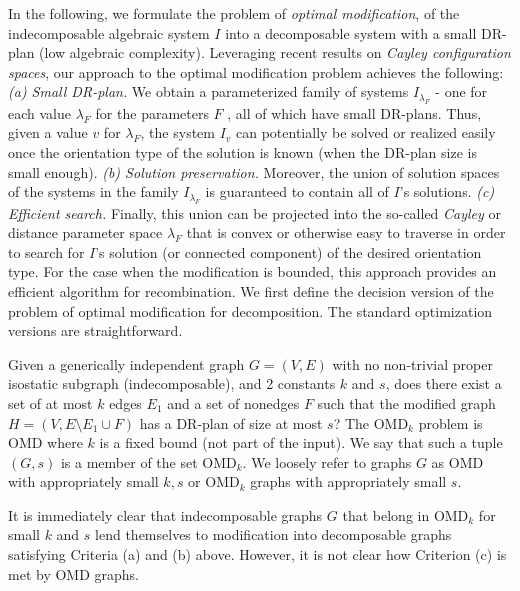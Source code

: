In the following, we formulate the problem of {\em optimal
modification},
of the indecomposable
algebraic system $I$ into a decomposable system with a small DR-plan (low
algebraic complexity).
Leveraging recent results on {\em Cayley
configuration spaces}, our approach to the optimal modification problem
achieves the following: {\em (a) Small DR-plan.} We obtain a  parameterized family of systems
$I_{\lambda_F}$ -  one for each value $\lambda_F$ for the parameters $F$ ,  all of which have
small DR-plans. Thus, given a value $v$ for $\lambda_F$, the system $I_v$ can
potentially be solved or realized easily once the orientation type of the solution
is known  (when the DR-plan size is small enough).
{\em (b) Solution preservation.} Moreover, the union of solution spaces of the systems in the family
$I_{\lambda_F}$
is guaranteed to contain
all of $I$'s solutions. {\em (c) Efficient search.} Finally, this union can be projected into the
so-called {\em Cayley} or distance parameter space $\lambda_F$ that is convex
or otherwise easy to traverse in order to search for $I$'s solution
(or connected component)
of the desired orientation type.
For the case when the modification is bounded, this approach provides an efficient
algorithm for recombination. We first define the decision version of the
problem of optimal modification
for decomposition. The standard optimization versions are straightforward.

\medskip{} Given a generically
independent graph $G = (V,E)$
with no non-trivial proper isostatic subgraph (indecomposable), and 2 constants $k$ and $s$,
does there exist a set of at most $k$  edges $E_1$ and a set of nonedges $F$
such that the modified graph $H = (V, E\setminus E_1 \cup F)$ has a DR-plan
of size at most $s$?  The OMD$_k$ problem is  OMD where $k$ is a fixed bound (not
part of the input).   We say that such a tuple $(G,s)$ is a member of the
set OMD$_k$. We loosely refer to graphs $G$ as OMD with appropriately small $k,s$ or OMD$_k$ graphs
with appropriately small $s$.


It is immediately clear that indecomposable graphs $G$ that belong in OMD$_k$ for small $k$ and
$s$  lend themselves to modification  into decomposable graphs
satisfying Criteria (a) and (b) above.
However, it is not clear how Criterion (c) is met by OMD graphs.
%
